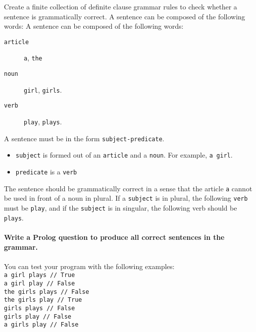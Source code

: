 \noindent
Create a finite collection of definite clause grammar rules to check whether a sentence is grammatically
correct. A sentence can be composed of the following words:
%
A sentence can be composed of the following words:
\begin{description}
	\item [\texttt{article}] \texttt{a}, \texttt{the}
	\item [\texttt{noun}] \texttt{girl}, \texttt{girls}.
	\item [\texttt{verb}] \texttt{play}, \texttt{plays}.
\end{description}
%
A sentence must be in the form \texttt{subject-predicate}.
%
\begin{itemize}
\item \texttt{subject} is formed out of an \texttt{article} and a \texttt{noun}. For example, \texttt{a girl}.
\item \texttt{predicate} is a \texttt{verb}
\end{itemize}
%
The sentence should be grammatically correct in a sense that the article \texttt{a} cannot be used in front of a noun in plural. If a \texttt{subject} is in plural, the following \texttt{verb} must be \texttt{play}, and if the \texttt{subject} is in singular, the following verb should be \texttt{plays}.
\\ \\ 
%
\textbf{Write a Prolog question to produce all correct sentences in the grammar.}\\ \\
%
You can test your program with the following examples: \\
\texttt{a girl plays // True} \\
\texttt{a girl play // False} \\
\texttt{the girls plays // False} \\
\texttt{the girls play // True} \\
\texttt{girls plays // False} \\
\texttt{girls play // False} \\
\texttt{a girls play // False} \\

